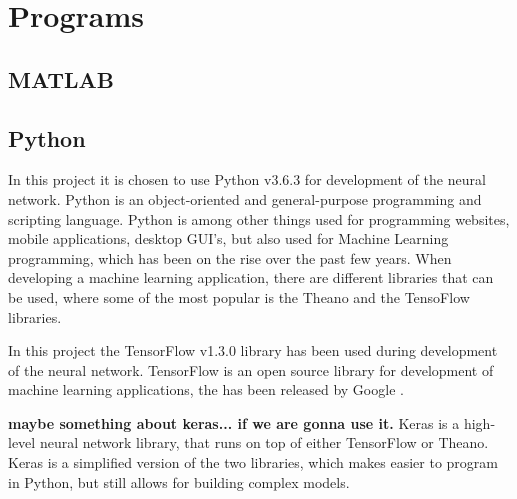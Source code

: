 \section{Programs}


\subsection{MATLAB}


\subsection{Python}
In this project it is chosen to use Python v3.6.3 for development of the neural network.  
Python is an object-oriented and general-purpose programming and scripting language. Python is among other things used for programming websites, mobile applications, desktop GUI's, but also used for Machine Learning programming, which has been on the rise over the past few years.    
When developing a machine learning application, there are different libraries that can be used, where some of the most popular is the Theano and the TensoFlow libraries.\citep{Swamynathan2017}

In this project the TensorFlow v1.3.0 library has been used during development of the neural network. 
TensorFlow is an open source library for development of machine learning applications, the has been released by Google \citep{Swamynathan2017}. 


\textbf{maybe something about keras... if we are gonna use it.  }
Keras is a high-level neural network library, that runs on top of either TensorFlow or Theano. Keras is a simplified version of the two libraries, which makes easier to program in Python, but still allows for building complex models.\citep{Swamynathan2017}  